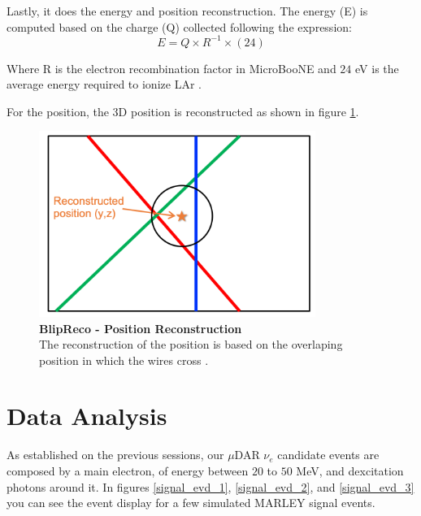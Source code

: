 Lastly, it does the energy and position reconstruction. The energy (E) is computed based on the charge (Q) collected following the expression:
\begin{equation}
    E=Q\times R^{-1} \times (24)
\end{equation}

Where R is the electron recombination factor in MicroBooNE and $24$ eV is the average energy required to ionize LAr \cite{lariat_calorimetry_lar}. 

For the position, the 3D position is reconstructed as shown in figure \ref{blip_position}. 

\begin{figure}[h!]
    \centering
    \includegraphics[width=90mm]{Figures/blip_reco_position.png}
    \caption[BlipReco - Position Reconstruction]{{\textbf{BlipReco - Position Reconstruction}}\\ The reconstruction of the position is based on the overlaping position in which the wires cross \cite{will_CM_Aug}.}
    \label{blip_position}
\end{figure}

\section{Data Analysis}
As established on the previous sessions, our $\mu$DAR $\nu_e$ candidate events are composed by a main electron, of energy between $20$ to $50$ MeV, and dexcitation photons around it. In figures \ref{signal_evd_1}, \ref{signal_evd_2}, and \ref{signal_evd_3} you can see the event display for a few simulated MARLEY signal events. 

